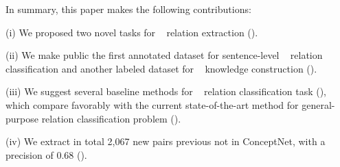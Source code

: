 In summary, this paper makes the following contributions:

(i) We proposed two novel tasks for \lnear~ relation extraction
().

(ii) We make public the first annotated dataset for 
sentence-level \lnear~ relation classification and another labeled dataset for
\lnear~ knowledge construction (). 

(iii) We suggest several baseline methods for \lnear~ relation 
classification task (), 
which compare favorably with the current state-of-the-art
method for general-purpose relation classification problem (). 

(iv) We extract in total 2,067 new pairs previous not in
ConceptNet, with a precision of 0.68 ().

